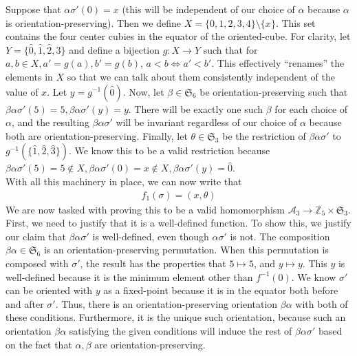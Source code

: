 \documentclass[10pt,letterpaper]{report}
\begin{document}
Suppose that $\alpha \sigma' (0) = x$ (this will be independent of our choice of $\alpha$ because $\alpha$ is orientation-preserving).  Then we define $X = \{0,1,2,3,4\} \setminus \{x\}$.  This set contains the four center cubies in the equator of the oriented-cube.  For clarity, let $Y = \{\hat{0},\hat{1},\hat{2},\hat{3}\}$ and define a bijection $g : X \rightarrow Y$ such that for $a,b \in X, a' = g(a), b' = g(b)$, $a < b \Leftrightarrow a' < b'$.  This effectively ``renames'' the elements in $X$ so that we can talk about them consistently independent of the value of $x$.  Let $y = g^{-1}(\hat{0})$.  Now, let $\beta \in \mathfrak{S}_6$ be orientation-preserving such that $\beta \alpha \sigma' (5) = 5, \beta \alpha \sigma' (y) = y$.  There will be exactly one such $\beta$ for each choice of $\alpha$, and the resulting $\beta \alpha \sigma'$ will be invariant regardless of our choice of $\alpha$ because both are orientation-preserving.  Finally, let $\theta \in \mathfrak{S}_3$ be the restriction of $\beta \alpha \sigma'$ to $g^{-1}(\{\hat{1}, \hat{2}, \hat{3}\})$.  We know this to be a valid restriction because $\beta \alpha \sigma' (5) = 5 \notin X, \beta \alpha \sigma' (0) = x \notin X, \beta \alpha \sigma' (y) = \hat{0}$. \\

With all this machinery in place, we can now write that \begin{align*}
f_1(\sigma) = (x, \theta)
\end{align*}
We are now tasked with proving this to be a valid homomorphism $\mathcal{A}_3 \rightarrow \mathbb{Z}_5 \times \mathfrak{S}_3$.  First, we need to justify that it is a well-defined function.  To show this, we justify our claim that $\beta \alpha \sigma'$ is well-defined, even though $\alpha \sigma'$ is not.  The composition $\beta \alpha \in \mathfrak{S}_6$ is an orientation-preserving permutation.  When this permutation is composed with $\sigma'$, the result has the properties that $5 \mapsto 5$, and $y \mapsto y$.  This $y$ is well-defined because it is the minimum element other than $f^{-1}(0)$.  We know $\sigma'$ can be oriented with $y$ as a fixed-point because it is in the equator both before and after $\sigma'$.  Thus, there is an orientation-preserving orientation $\beta \alpha$ with both of these conditions.  Furthermore, it is the unique such orientation, because such an orientation $\beta \alpha$ satisfying the given conditions will induce the rest of $\beta \alpha \sigma'$ based on the fact that $\alpha, \beta$ are orientation-preserving. \\
\end{document}
